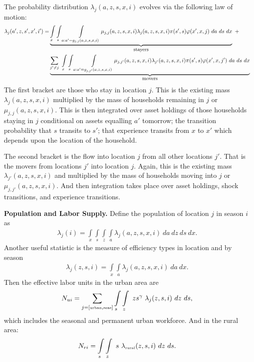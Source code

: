 \documentclass[12pt,pdftex]{article}
\begin{document}
\begin{onehalfspacing}
The probability distribution $\lambda_{j}(a, z, s, x, i)$ evolves via the following law of motion:
\begin{align}
\lambda_{j}(a', z, s', x', i')  =  & \underbrace{ \int\limits_{x} \int\limits_{s} \int\limits_{a: a' = g_{j,j}(a, z, s, x, i)} \mu_{j,j}(a, z, s, x, i) \lambda_{j}(a, z, s, x, i) \pi(s',s) \varphi(x',x, j)\ da \ ds \ dx }_{\small \mbox{stayers}} \ + \nonumber \\
& \underbrace{\sum_{j' \neq j}\  \int\limits_{x} \int\limits_{s} \int\limits_{a: a' = g_{j,j'}(a, z, s, x, i)}  \mu_{j,j'}(a, z, s, x, i) \lambda_{j'}(a, z, s, x, i) \pi(s',s) \varphi(x',x, j') \ da \ ds \ dx }_{\small \mbox{movers}}
\label{eq:dce_law_motion}
\end{align}
The first bracket are those who stay in location $j$. This is the existing mass $\lambda_{j}(a, z, s, x, i)$ multiplied by the mass of households remaining in $j$ or $\mu_{j,j}(a, z, s, x, i)$. This is then integrated over asset holdings of those households staying in $j$ conditional on assets equalling $a'$ tomorrow; the transition probability that $s$ transits to $s'$; that experience transits from $x$ to $x'$ which depends upon the location of the household.

The second bracket is the flow into location $j$ from all other locations $j'$. That is the movers from locations $j'$ into location $j$. Again, this is the existing mass $\lambda_{j'}(a, z, s, x, i)$ and multiplied by the mass of households moving into $j$ or $\mu_{j,j'}(a, z, s, x, i)$. And then integration takes place over asset holdings, shock transitions, and experience transitions.

\textbf{Population and Labor Supply.} Define the population of location $j$ in season $i$ as
\begin{align}
\lambda_j(i) = \int\limits_{x} \int\limits_{s} \int\limits_{z} \int\limits_{a}  \lambda_j(a, z, s, x, i)  \ da  \ dz \ ds \ dx.
\label{eq:island_populaiton}
\end{align}
Another useful statistic is the measure of efficiency types in location and by season
\begin{align}
\lambda_j(z, s, i) = \int\limits_{x}  \int\limits_{a}  \lambda_j(a, z, s, x, i) \ da  \ dx.
\end{align}
Then the effective labor units in the urban area are
\begin{align}
N_{ui} = \sum_{j = [\mbox{\tiny urban}, \mbox{\tiny seas}]}\int\limits_{s} \int\limits_{z} \  z s^{\gamma} \ \lambda_j(z, s, i) \ dz \ ds,
\label{eq:urban_units}
\end{align}
which includes the seasonal and permanent urban workforce. And in the rural area:
\begin{align}
N_{ri} = \int\limits_{s} \int\limits_{z}  \  s \ \lambda_{\mbox{\tiny rural}}(z, s, i) \ dz \ ds.
\label{eq:rural_units}
\end{align}


\end{onehalfspacing}
\end{document}
